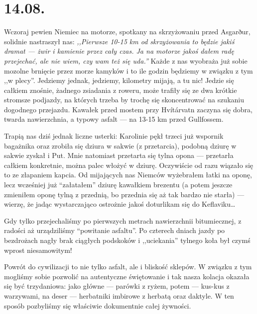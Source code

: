 \chapter*{14.08.}

Wczoraj pewien Niemiec na motorze, spotkany na skrzyżowaniu przed Asgarður, solidnie nastraszył nas: \emph{,,Pierwsze 10-15 km od skrzyżowania to będzie jakiś dramat --- żwir i kamienie przez cały czas. Ja na motorze jakoś dałem radę przejechać, ale nie wiem, czy wam też się uda.''} Każde z nas wyobraża już sobie mozolne brnięcie przez morze kamyków i to ile godzin będziemy w związku z tym ,,w plecy''. Jedziemy jednak, jedziemy, kilometry mijają, a tu nic! Jedzie się całkiem znośnie, żadnego zsiadania z roweru, może trafiły się ze dwa krótkie stromsze podjazdy, na których trzeba by trochę się skoncentrować na szukaniu dogodnego przejazdu. Kawałek przed mostem przy Hvítárvatn zaczyna się dobra, twarda nawierzchnia, a typowy asfalt --- na 13-15 km przed Gullfossem.


Trapią nas dziś jednak liczne usterki: Karolinie pękł trzeci już wspornik bagażnika oraz zrobiła się dziura w sakwie (z przetarcia), podobną dziurę w sakwie zyskał i Put. Mnie natomiast przetarta się tylna opona --- przetarła całkiem konkretnie, można palec włożyć w dziurę. Oczywiście od razu wiązało się to ze złapaniem kapcia. Od mijających nas Niemców wyżebrałem łatki na oponę, lecz wcześniej już “załatałem” dziurę kawałkiem brezentu (a potem jeszcze zmieniłem oponę tylną z przednią, bo przednia się aż tak bardzo nie starła) --- wierzę, że jadąc wystarczająco ostrożnie jakoś doturlikam się do Keflaviku…


Gdy tylko przejechaliśmy po pierwszych metrach nawierzchnii bitumiecznej, z radości aż urządziliśmy “powitanie asfaltu”. Po czterech dniach jazdy po bezdrożach nagły brak ciągłych podskoków i ,,uciekania'' tylnego koła był czymś wprost niesamowitym!

Powrót do cywilizacji to nie tylko asfalt, ale i bliskość sklepów. W związku z tym mogliśmy sobie pozwolić na autentyczne świętowanie i tak nasza kolacja okazała się być trzydaniowa: jako główne --- parówki z ryżem, potem --- kus-kus z warzywami, na deser --- herbatniki imbirowe z herbatą oraz daktyle. W ten sposób pozbyliśmy się właściwie dokumentnie całej żywności.

